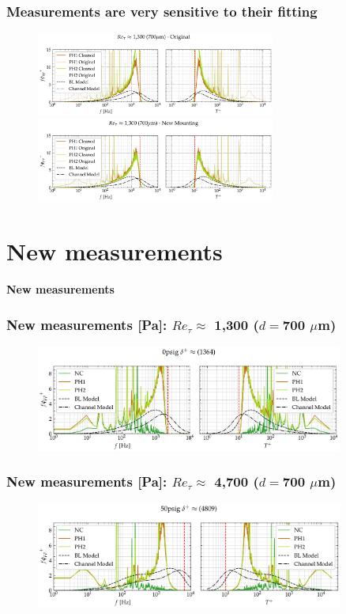 \documentclass[aspectratio=169,9pt]{beamer}
\begin{document}
\begin{frame}
  \frametitle{Measurements are very sensitive to their fitting}
  \begin{figure}
  \centering
    \includegraphics[width=0.7\textwidth]{remount_test/original_cleaned.png}
    \includegraphics[width=0.7\textwidth]{remount_test/new_mount_cleaned.png}
  \end{figure}

\end{frame}

\section{New measurements}
\begin{frame}
  \centering
  \vfill
  {\Huge\bfseries \textcolor{cardinalred}{New measurements}}
  \vfill
\end{frame}


\begin{frame}
  \frametitle{New measurements [Pa]: $Re_\tau\approx$ 1,300 ($d=$700 $\mu$m)}
  \begin{figure}
    \centering
    \includegraphics[width=0.9\textwidth]{final/0psig.png}
  \end{figure}
\end{frame}

\begin{frame}
  \frametitle{New measurements [Pa]: $Re_\tau \approx$ 4,700 ($d=$700 $\mu$m)}
  \begin{figure}
    \centering
    \includegraphics[width=0.9\textwidth]{final/50psig.png}
  \end{figure}
\end{frame}
\end{document}
